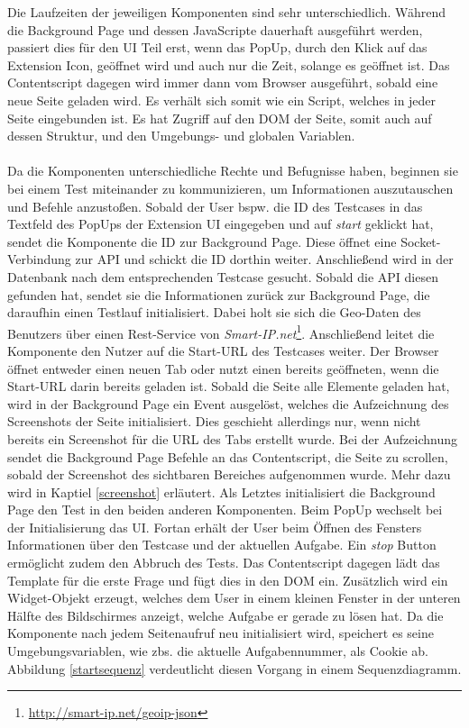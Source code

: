 Die Laufzeiten der jeweiligen Komponenten sind sehr unterschiedlich. Während die Background Page und dessen JavaScripte dauerhaft ausgeführt werden, passiert dies für den UI Teil erst, wenn das PopUp, durch den Klick auf das Extension Icon, geöffnet wird und auch nur die Zeit, solange es geöffnet ist. Das Contentscript dagegen wird immer dann vom Browser ausgeführt, sobald eine neue Seite geladen wird. Es verhält sich somit wie ein Script, welches in jeder Seite eingebunden ist. Es hat Zugriff auf den \Gls{DOM} der Seite, somit auch auf dessen Struktur, und den Umgebungs- und globalen Variablen.\\
\\
Da die Komponenten unterschiedliche Rechte und Befugnisse haben, beginnen sie bei einem Test miteinander zu kommunizieren, um Informationen auszutauschen und Befehle anzustoßen. Sobald der User bspw. die ID des Testcases in das Textfeld des PopUps der Extension UI eingegeben und auf \textit{start} geklickt hat, sendet die Komponente die ID zur Background Page. Diese öffnet eine Socket-Verbindung zur API und schickt die ID dorthin weiter. Anschließend wird in der Datenbank nach dem entsprechenden Testcase gesucht. Sobald die API diesen gefunden hat, sendet sie die Informationen zurück zur Background Page, die daraufhin einen Testlauf initialisiert. Dabei holt sie sich die Geo-Daten des Benutzers über einen Rest-Service von \textit{Smart-IP.net}\footnote{\url{http://smart-ip.net/geoip-json}}. Anschließend leitet die Komponente den Nutzer auf die Start-URL des Testcases weiter. Der Browser öffnet entweder einen neuen Tab oder nutzt einen bereits geöffneten, wenn die Start-URL darin bereits geladen ist. Sobald die Seite alle Elemente geladen hat, wird in der Background Page ein Event ausgelöst, welches die Aufzeichnung des Screenshots der Seite initialisiert. Dies geschieht allerdings nur, wenn nicht bereits ein Screenshot für die URL des Tabs erstellt wurde. Bei der Aufzeichnung sendet die Background Page Befehle an das Contentscript, die Seite zu scrollen, sobald der Screenshot des sichtbaren Bereiches aufgenommen wurde. Mehr dazu wird in Kaptiel \ref{screenshot} erläutert. Als Letztes initialisiert die Background Page den Test in den beiden anderen Komponenten. Beim PopUp wechselt bei der Initialisierung das UI. Fortan erhält der User beim Öffnen des Fensters Informationen über den Testcase und der aktuellen Aufgabe. Ein \textit{stop} Button ermöglicht zudem den Abbruch des Tests. Das Contentscript dagegen lädt das Template für die erste Frage und fügt dies in den DOM ein. Zusätzlich wird ein Widget-Objekt erzeugt, welches dem User in einem kleinen Fenster in der unteren Hälfte des Bildschirmes anzeigt, welche Aufgabe er gerade zu lösen hat. Da die Komponente nach jedem Seitenaufruf neu initialisiert wird, speichert es seine Umgebungsvariablen, wie zbs. die aktuelle Aufgabennummer, als Cookie ab. Abbildung \ref{startsequenz} verdeutlicht diesen Vorgang in einem Sequenzdiagramm.

